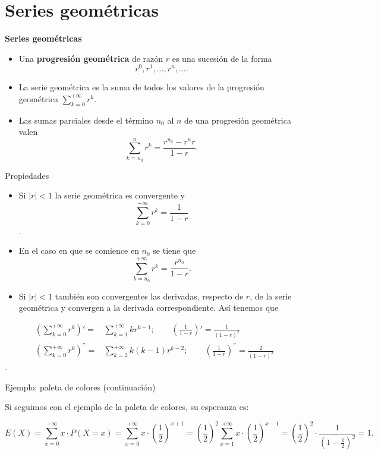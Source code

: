 \documentclass[
  letterpaper,
  DIV=11,
  numbers=noendperiod]{scrreprt}
\providecommand{\tightlist}{%
  \setlength{\itemsep}{0pt}\setlength{\parskip}{0pt}}\usepackage{longtable,booktabs,array}
\begin{document}
\section{Series geométricas}\label{series-geomuxe9tricas}

\textbf{Series geométricas}

\begin{itemize}
\tightlist
\item
  Una \textbf{progresión geométrica} de razón \(r\) es una sucesión de
  la forma\\
  \[
  r^0, r^1,\ldots,r^n,\ldots.
  \]
\item
  La serie geométrica es la suma de todos los valores de la progresión
  geométrica \(\displaystyle\sum_{k=0}^{+\infty} r^k\).
\item
  Las sumas parciales desde el término \(n_0\) al \(n\) de una
  progresión geométrica valen \[
  \sum_{k=n_0}^n r^k=\frac{r^{n_0}- r^n r}{1-r}.
  \]
\end{itemize}

Propiedades

\begin{itemize}
\item
  Si \(|r|<1\) la serie geométrica es convergente y
  \[\sum_{k=0}^{+\infty }
  r^k=\frac1{1-r}\].
\item
  En el caso en que se comience en \(n_0\) se tiene que
  \[\sum_{k=n_0}^{+\infty} r^k=\frac{r^{n_0}}{1-r}.\]
\item
  Si \(|r|<1\) también son convergentes las derivadas, respecto de
  \(r\), de la serie geométrica y convergen a la derivada
  correspondiente. Así tenemos que
\end{itemize}

\begin{eqnarray*}
\left(\sum_{k=0}^{+\infty} r^k\right)'= & \sum_{k=1}^{+\infty}k
r^{k-1}; \qquad  \left(\frac1{1-r}\right)'=\frac1{(1-r)^2}\\
\left(\sum_{k=0}^{+\infty} r^k\right)^{''}=&\sum_{k=2}^{+\infty}k (k-1)
r^{k-2}  ;\qquad  \left(\frac1{1-r}\right)^{''}=\frac2{(1-r)^3}
\end{eqnarray*}.

Ejemplo: paleta de colores (continuación)

Si seguimos con el ejemplo de la paleta de colores, su esperanza es:

\[E(X)=\sum_{x=0}^{+\infty} x\cdot  P(X=x)=\sum_{x=0}^{+\infty} x\cdot
\left(\frac12\right)^{x+1}=  \left(\frac12\right)^2\sum_{x=1}^{+\infty} x\cdot
\left(\frac12\right)^{x-1}=\left(\frac12\right)^2\cdot
\frac1{\left(1-\frac12\right)^2}=1.
\]
\end{document}
